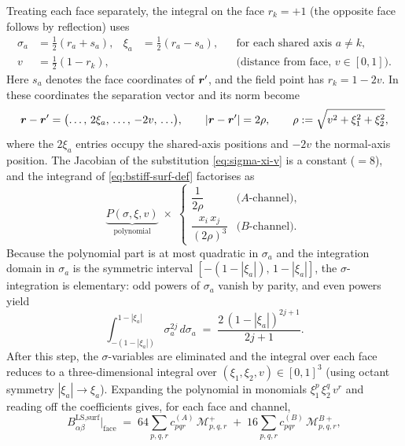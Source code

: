 Treating each face separately, the integral on the face
$r_k = +1$ (the opposite face follows by reflection) uses
\begin{equation}
\begin{aligned}
  \sigma_a &= \tfrac{1}{2}(r_a + s_a), &
  \xi_a &= \tfrac{1}{2}(r_a - s_a), &
  &\text{for each shared axis } a \neq k,\\
  v &= \tfrac{1}{2}(1 - r_k), & & &
  &\text{(distance from face, $v \in [0,1]$).}
\end{aligned}
\label{eq:sigma-xi-v}
\end{equation}
Here $s_a$ denotes the face coordinates of $\bm{r}'$, and the field point
has $r_k = 1 - 2v$.  In these coordinates the separation vector and
its norm become
\begin{equation}
  \bm{r} - \bm{r}'
  = \bigl(\ldots,\,2\xi_a,\,\ldots,\,-2v,\,\ldots\bigr),
  \qquad
  |\bm{r}-\bm{r}'| = 2\rho,
  \qquad
  \rho := \sqrt{v^2 + \xi_1^2 + \xi_2^2},
  \label{eq:face-separation}
\end{equation}
where the $2\xi_a$ entries occupy the shared-axis positions and $-2v$
the normal-axis position.  The Jacobian of the substitution
\eqref{eq:sigma-xi-v} is a constant ($= 8$), and the integrand of
\eqref{eq:bstiff-surf-def} factorises as
\begin{equation}
  \underbrace{P(\sigma, \xi, v)}_{\text{polynomial}}
  \;\times\;
  \begin{cases}
    \dfrac{1}{2\rho} &\text{($A$-channel)},\\[6pt]
    \dfrac{x_i\,x_j}{(2\rho)^3} &\text{($B$-channel)}.
  \end{cases}
  \label{eq:face-factorisation}
\end{equation}
Because the polynomial part is at most quadratic in $\sigma_a$ and the
integration domain in $\sigma_a$ is the symmetric interval
$[-(1-|\xi_a|),\,1-|\xi_a|]$, the $\sigma$-integration is elementary:
odd powers of $\sigma_a$ vanish by parity, and even powers yield
\begin{equation}
  \int_{-(1-|\xi_a|)}^{1-|\xi_a|}\! \sigma_a^{2j}\,d\sigma_a
  \;=\; \frac{2\,(1-|\xi_a|)^{2j+1}}{2j+1}.
  \label{eq:sigma-int}
\end{equation}
After this step, the $\sigma$-variables are eliminated and the integral
over each face reduces to a three-dimensional integral over
$(\xi_1,\xi_2,v) \in [0,1]^3$ (using octant symmetry
$|\xi_a| \to \xi_a$).  Expanding the polynomial in monomials
$\xi_1^p\,\xi_2^q\,v^r$ and reading off the coefficients gives,
for each face and channel,
\begin{equation}
  B^{\text{LS,surf}}_{\alpha\beta}\big|_{\text{face}}
  \;=\; 64\!\!\sum_{p,q,r}\! c^{(A)}_{pqr}\,\mathcal{M}^+_{p,q,r}
  \;+\; 16\!\!\sum_{p,q,r}\!c^{(B)}_{pqr}\,\mathcal{M}^{B+}_{p,q,r},
  \label{eq:surf-master-expansion}
\end{equation}
